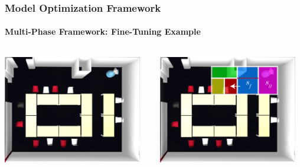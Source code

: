 \begin{frame}
\frametitle{Model Optimization Framework}
\framesubtitle{Multi-Phase Framework: Fine-Tuning Example}

\begin{columns}
	\begin{column}{0.5\textwidth}
		\includegraphics[width=0.95\textwidth]{figures/implementation/uol_bl_phase_3_small}
	\end{column}
	\begin{column}{0.5\textwidth}
		\includegraphics[width=0.95\textwidth]{figures/implementation/uol_bl_phase_3_2_smallv6.pdf}
	\end{column}
\end{columns}

\end{frame}

